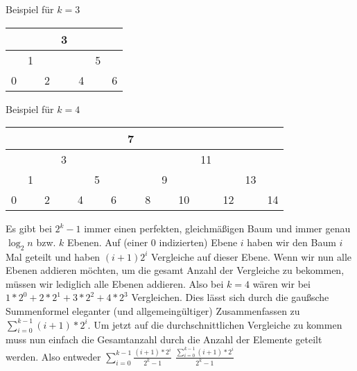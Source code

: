 \documentclass{article}
\begin{document}
\begin{center}
	\vspace{1em}

	Beispiel für $k = 3$

	\vspace{1em}

	\begin{tabular}{|c|c|c|c|c|c|c|}
		\hline
		  &   &   & 3 &   &   &   \\
		\hline
		  & 1 &   &   &   & 5 &   \\
		\hline
		0 &   & 2 &   & 4 &   & 6 \\
		\hline
	\end{tabular}

	\vspace{2em}

	Beispiel für $k = 4$

	\vspace{1em}

	\begin{tabular}{|c|c|c|c|c|c|c|c|c|c|c|c|c|c|c|}
		\hline
		  &   &   &   &   &   &   & 7 &   &   &    &    &    &    &    \\
		\hline
		  &   &   & 3 &   &   &   &   &   &   &    & 11 &    &    &    \\
		\hline
		  & 1 &   &   &   & 5 &   &   &   & 9 &    &    &    & 13 &    \\
		\hline
		0 &   & 2 &   & 4 &   & 6 &   & 8 &   & 10 &    & 12 &    & 14 \\
		\hline
	\end{tabular}
\end{center}

\newpage

Es gibt bei $2^k - 1$ immer einen perfekten, gleichmäßigen Baum und immer genau $\log_2n$ bzw. $k$ Ebenen.
Auf (einer 0 indizierten) Ebene $i$ haben wir den Baum $i$ Mal geteilt und haben $(i + 1) 2^i$ Vergleiche
auf dieser Ebene. Wenn wir nun alle Ebenen addieren möchten, um die gesamt Anzahl der Vergleiche zu bekommen,
müssen wir lediglich alle Ebenen addieren. Also bei $k = 4$ wären wir bei $1 * 2^0 + 2 * 2^1 + 3 * 2^2 + 4 * 2^3$
Vergleichen. Dies lässt sich durch die gaußsche Summenformel eleganter (und allgemeingültiger) Zusammenfassen
zu $\sum_{i=0}^{k - 1} (i + 1) * 2^i$. Um jetzt auf die durchschnittlichen Vergleiche zu kommen muss nun einfach
die Gesamtanzahl durch die Anzahl der Elemente geteilt werden. Also entweder $\sum_{i=0}^{k - 1} \frac{(i + 1) * 2^i}{2^k - 1}$
$\frac{\sum_{i=0}^{k - 1} (i + 1) * 2^i}{2^k - 1}$
\end{document}
